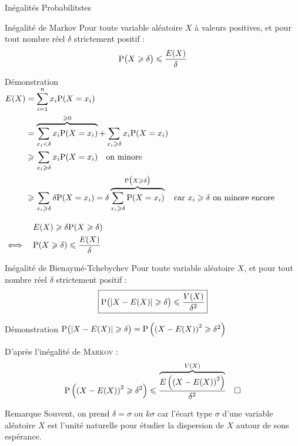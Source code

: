 \documentclass{coursbook}
\begin{document}
    \begin{Gpartie}{Inégalités Probabilitstes} 
        \begin{Spartie}{Inégalité de Markov} 
            Pour toute variable aléatoire $X$ à valeurs positives, et pour tout nombre réel $\delta$ strictement positif : \[\Pde\big(X\geq\delta\big)\leq\frac{E(X)}{\delta}\]
            \begin{SSpartie}{Démonstration} 
                $\begin{aligned}[t]
                    E(X) &= \sum_{i=1}^n x_i\mathrm{P}(X=x_i) \\
                    &= \overbrace{\sum_{x_i<\delta} x_i\mathrm{P}(X=x_i)}^{\geqslant0} + \sum_{x_i\geqslant\delta} x_i\mathrm{P}(X=x_i) \\
                    &\geqslant\sum_{x_i\geqslant\delta} x_i\mathrm{P}(X=x_i)\quad\text{on minore}\\
                    &\geqslant\sum_{x_i\geqslant\delta} \delta\mathrm{P}(X=x_i)=\delta\overbrace{\sum_{x_i\geqslant\delta}\mathrm{P}(X=x_i)}^{\mathrm{P}\big(X\geqslant\delta\big)}\quad\text{car $x_i\geqslant\delta$ on minore encore}
                \end{aligned}$

                $\begin{aligned}[t]
                    &\quad E(X)\geq\delta\Pde(X\geq\delta) \\
                    \iff&\quad \Pde(X\geq\delta)\leq\frac{E(X)}{\delta}
                \end{aligned}$
            \end{SSpartie}
        \end{Spartie}
        \begin{Spartie}{Inégalité de Bienaymé-Tchebychev} 
            Pour toute variable aléatoire $X$, et pour tout nombre réel $\delta$ strictement positif : \[\boxed{\Pde\big(\lvert X-E(X)\rvert\geq\delta\big)\leq\frac{V(X)}{\delta^2}}\]
            \begin{SSpartie}{Démonstration} 
                $\mathrm{P}\big(\lvert X-E(X)\rvert\geqslant\delta\big)=\mathrm{P}\left(\left(X-E(X)\right)^2\geqslant\delta^2\right)$

                D'après l'inégalité de \textsc{Markov} : \[\Pde\left(\left(X-E(X)\right)^2\geq\delta^2\right)\leq\frac{\overbrace{E\left(\left(X-E(X)\right)^2\right)}^{V(X)}}{\delta^2}\quad\square\]
            \end{SSpartie}
        \end{Spartie}
        \begin{Spartie}{Remarque} 
            Souvent, on prend $\delta=\sigma$ ou $k\sigma$ car l'écart type $\sigma$ d'une variable aléatoire $X$ est l'unité naturelle pour étudier la dispersion de $X$ autour de sons espérance.


\end{Spartie}
\end{Gpartie}
\end{document}
